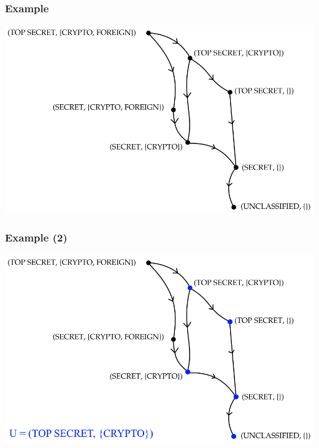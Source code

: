 \documentclass[10pt]{beamer}
\begin{document}
\begin{frame}
	\frametitle{Example}
	
	\includegraphics[width=\textwidth]{graphics/blp_lattice}
\end{frame}

\begin{frame}
	\frametitle{Example (2)}
	
	\includegraphics[width=\textwidth]{graphics/blp_lattice_2}
\end{frame}


{\aauwavesbg
\begin{frame}
\end{frame}}
\end{document}
